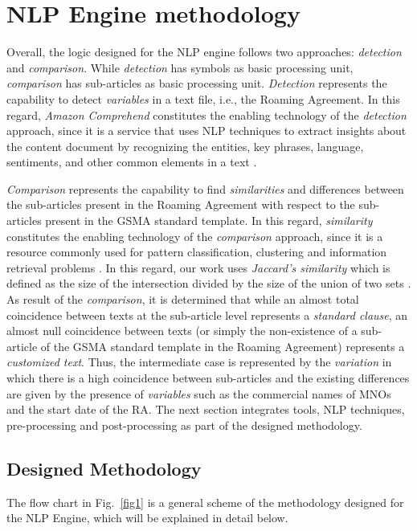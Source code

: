 \section{NLP Engine methodology}
Overall, the logic designed for the NLP engine follows two approaches: \textit{detection} and \textit{comparison}. While \textit{detection} has symbols as basic processing unit, \textit{comparison} has sub-articles as basic processing unit. \textit{Detection} represents the capability to detect \textit{variables} in a text file, i.e., the Roaming Agreement. In this regard, \textit{Amazon Comprehend} constitutes the enabling technology of the \textit{detection} approach, since it is a service that uses NLP techniques to extract insights about the content document by recognizing  the  entities,  key  phrases,  language,  sentiments,  and  other  common  elements  in  a  text \cite{AWS2021}.

\textit{Comparison} represents the capability to find \textit{similarities} and differences between the sub-articles present in the Roaming Agreement with respect to the sub-articles present in the GSMA standard template. In this regard, \textit{similarity} constitutes the enabling technology of the \textit{comparison} approach, since it is a resource commonly used for pattern classification, clustering and information retrieval problems \cite{7429408}. In this regard, our work uses  \textit{Jaccard's similarity} which is defined as the size of the intersection divided by the size of the union of two sets \cite{Gupta2018}. As result of the \textit{comparison}, it is determined that while an almost total coincidence between texts at the sub-article level represents a \textit{standard clause}, an almost null coincidence between texts (or simply the non-existence of a sub-article of the GSMA standard template in the Roaming Agreement) represents a \textit{customized text}. Thus, the intermediate case is represented by the \textit{variation} in which there is a high coincidence between sub-articles and the existing differences are given by the presence of \textit{variables} such as the commercial names of MNOs and the start date of the RA. The next section integrates tools, NLP techniques, pre-processing and post-processing as part of the designed methodology.

\subsection{Designed Methodology}
The flow chart in Fig.~\ref{fig1} is a general scheme of the methodology designed for the NLP Engine, which will be explained in detail below.

